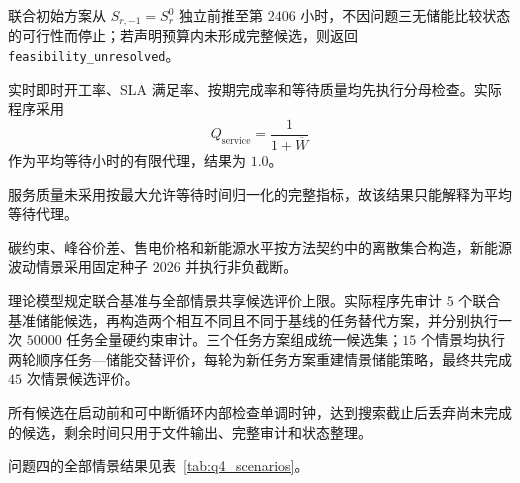\documentclass[withoutpreface,bwprint]{cumcmthesis}
\begin{document}
联合初始方案从 $S_{r,-1}=S_r^0$ 独立前推至第 $2406$ 小时，不因问题三无储能比较状态的可行性而停止；若声明预算内未形成完整候选，则返回 \texttt{feasibility\_unresolved}。

实时即时开工率、SLA 满足率、按期完成率和等待质量均先执行分母检查。实际程序采用
\begin{equation}
Q_{\mathrm{service}}=\frac{1}{1+\overline W}
\end{equation}
作为平均等待小时的有限代理，结果为 $1.0$。

服务质量未采用按最大允许等待时间归一化的完整指标，故该结果只能解释为平均等待代理。

碳约束、峰谷价差、售电价格和新能源水平按方法契约中的离散集合构造，新能源波动情景采用固定种子 $2026$ 并执行非负截断。

理论模型规定联合基准与全部情景共享候选评价上限。实际程序先审计 $5$ 个联合基准储能候选，再构造两个相互不同且不同于基线的任务替代方案，并分别执行一次 $50000$ 任务全量硬约束审计。三个任务方案组成统一候选集；$15$ 个情景均执行两轮顺序任务—储能交替评价，每轮为新任务方案重建情景储能策略，最终共完成 $45$ 次情景候选评价。

所有候选在启动前和可中断循环内部检查单调时钟，达到搜索截止后丢弃尚未完成的候选，剩余时间只用于文件输出、完整审计和状态整理。

问题四的全部情景结果见表~\ref{tab:q4_scenarios}。
\end{document}
